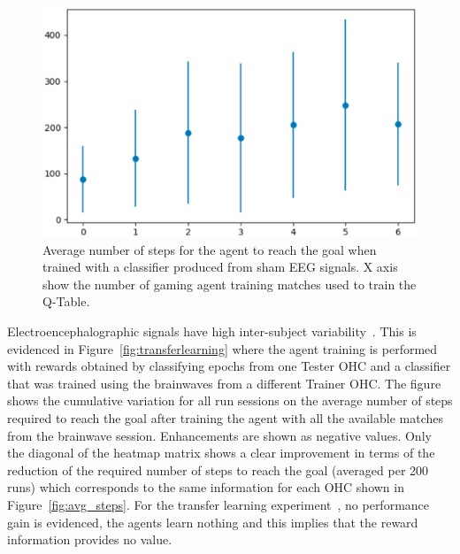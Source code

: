 \documentclass[journal]{IEEEtran}
\begin{document}
{{\begin{figure}[h!]
\centering
\includegraphics[scale=0.4]{Images/Average_steps/noise.eps}
\caption{Average number of steps for the agent to reach the goal when trained with a classifier produced from sham EEG signals. X axis show the number of gaming agent training matches used to train the Q-Table.}
\label{fig:avg_steps_noise}
\end{figure}

Electroencephalographic signals have high inter-subject variability~\cite{Chavarriaga2014}.  This is evidenced in Figure~\ref{fig:transferlearning} where the agent training is performed with rewards obtained by classifying epochs from one Tester OHC and a classifier that was trained using the brainwaves from a different Trainer OHC.  The figure shows the cumulative variation for all run sessions on the average number of steps required to reach the goal after training the agent with all the available matches from the brainwave session.  Enhancements are shown as negative values.  Only the diagonal of the heatmap matrix shows a clear improvement in terms of the reduction of the required number of steps to reach the goal (averaged per 200 runs) which corresponds to the same information for each OHC shown in Figure~\ref{fig:avg_steps}.  For the transfer learning experiment~\cite{Wu2016}, no performance gain is evidenced, the agents learn nothing and this implies that the reward information provides no value.


}}
\end{document}
